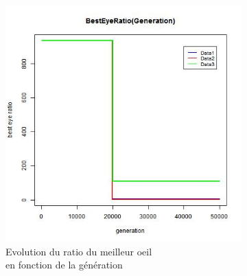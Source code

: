 \documentclass[a4paper,11pt]{article}
\begin{document}
%

\begin{figure}
\centering
\begin{subfigure}{.5\textwidth}
  \centering
\includegraphics[width=1\linewidth]{best_eye_ratio.jpeg}
\caption{Evolution du ratio du meilleur oeil \\en fonction de la génération}
\label{fig:modelisation}
\end{subfigure}%
\begin{subfigure}{.5\textwidth}
  \centering

\end{subfigure}
\end{figure}
\end{document}
